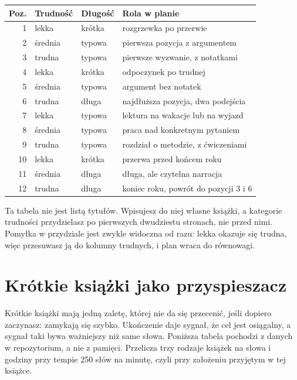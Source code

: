 \begin{center}
\begin{tabular}{@{}rllp{6.4cm}@{}}
\toprule
\textbf{Poz.} & \textbf{Trudność} & \textbf{Długość} & \textbf{Rola w planie} \\
\midrule
1  & lekka   & krótka  & rozgrzewka po przerwie \\
2  & średnia & typowa  & pierwsza pozycja z argumentem \\
3  & trudna  & typowa  & pierwsze wyzwanie, z notatkami \\
4  & lekka   & krótka  & odpoczynek po trudnej \\
5  & średnia & typowa  & argument bez notatek \\
6  & trudna  & długa   & najdłuższa pozycja, dwa podejścia \\
7  & lekka   & typowa  & lektura na wakacje lub na wyjazd \\
8  & średnia & typowa  & praca nad konkretnym pytaniem \\
9  & trudna  & typowa  & rozdział o metodzie, z ćwiczeniami \\
10 & lekka   & krótka  & przerwa przed końcem roku \\
11 & średnia & długa   & długa, ale czytelna narracja \\
12 & trudna  & długa   & koniec roku, powrót do pozycji 3 i 6 \\
\bottomrule
\end{tabular}
\end{center}

Ta tabela nie jest listą tytułów. Wpisujesz do niej własne książki, a kategorie trudności przydzielasz po pierwszych dwudziestu stronach, nie przed nimi. Pomyłka w przydziale jest zwykle widoczna od razu: lekka okazuje się trudna, więc przesuwasz ją do kolumny trudnych, i plan wraca do równowagi.

\section{Krótkie książki jako przyspieszacz}

Krótkie książki mają jedną zaletę, której nie da się przecenić, jeśli dopiero zaczynasz: zamykają się szybko. Ukończenie daje sygnał, że cel jest osiągalny, a sygnał taki bywa ważniejszy niż same słowa. Poniższa tabela pochodzi z danych w repozytorium, a nie z pamięci. Przelicza trzy rodzaje książek na słowa i godziny przy tempie 250 słów na minutę, czyli przy założeniu przyjętym w tej książce.

